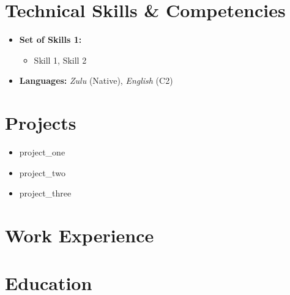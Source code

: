 \documentclass[11pt,a4paper,sans]{moderncv}
\newcommand{\skills}{Skill 1, Skill 2} %
\newcommand{\projectone}{project_one}
\newcommand{\projecttwo}{project_two}
\newcommand{\projectthree}{project_three}
\begin{document}
\makecvtitle

\vspace{-0.0cm}



\section{Technical Skills \& Competencies}
\begin{itemize}
\item \textbf{Set of Skills 1:} 
      \begin{itemize}
            \item \skills
      \end{itemize}

\item \textbf{Languages:} \textit{Zulu} (Native), \textit{English} (C2)
\end{itemize}

\vspace{0.2cm}

\section{Projects}
\begin{itemize}
\item \projectone
\item \projecttwo
\item \projectthree
\end{itemize}

\vspace{0.2cm}
\section{Work Experience}
\vspace{0.2cm}
\section{Education}
\end{document}
